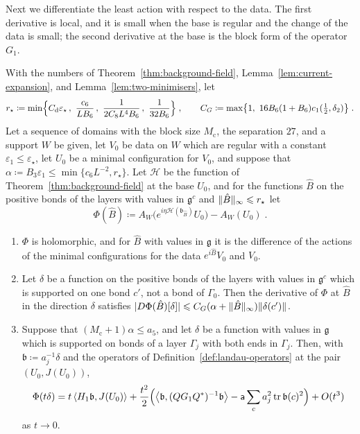 \documentclass[11pt]{preprint}
\DeclarePairedDelimiter{\abs}{\lvert}{\rvert}
\DeclarePairedDelimiter{\norm}{\lVert}{\rVert}
\numberwithin{equation}{section}
\begin{document}
Next we differentiate the least action with respect to the data. The first derivative is local, and it is small when the base is regular and the change of the data is small; the second derivative at the base is the block form of the operator $G_1$.

\begin{lemma}\label{lem:data-action}
With the numbers of Theorem~\ref{thm:background-field}, Lemma~\ref{lem:current-expansion}, and Lemma~\ref{lem:two-minimisers}, let
\begin{equation}\label{eq:data-action-numbers}
    r_\star \coloneqq \min\Bigl\{ C_{\mathrm d}\varepsilon_\star\,,\ \frac{c_6}{LB_6}\,,\ \frac{1}{2C_8L^4B_6}\,,\ \frac{1}{32B_6} \Bigr\}\;,
    \qquad
    C_G \coloneqq \max\bigl\{ 1,\ 16B_6(1 + B_6)c_1(\tfrac{1}{2}, \delta_2) \bigr\}\;.
\end{equation}
Let a sequence of domains with the block size $M_{\mathrm c}$, the separation $27$, and a support $W$ be given, let $V_0$ be data on $W$ which are regular with a constant $\varepsilon_1 \leqslant \varepsilon_\star$, let $U_0$ be a minimal configuration for $V_0$, and suppose that $\alpha \coloneqq B_3\varepsilon_1 \leqslant \min\{ c_6L^{-2}, r_\star \}$. Let $\mathcal H$ be the function of Theorem~\ref{thm:background-field} at the base $U_0$, and for the functions $\hat B$ on the positive bonds of the layers with values in $\mathfrak g^c$ and $\norm{\hat B}_\infty \leqslant r_\star$ let
\begin{equation}\label{eq:data-action}
    \Phi(\hat B) \coloneqq A_W\bigl(e^{i\eta\mathcal H(\mathfrak b_{\hat B})}U_0\bigr) - A_W(U_0)\;.
\end{equation}
\begin{enumerate}[label=(\roman*)]
\item $\Phi$ is holomorphic, and for $\hat B$ with values in $\mathfrak g$ it is the difference of the actions of the minimal configurations for the data $e^{i\hat B}V_0$ and $V_0$.
\item Let $\delta$ be a function on the positive bonds of the layers with values in $\mathfrak g^c$ which is supported on one bond $c'$, not a bond of $\Gamma_0$. Then the derivative of $\Phi$ at $\hat B$ in the direction $\delta$ satisfies $\abs{D\Phi(\hat B)[\delta]} \leqslant C_G(\alpha + \norm{\hat B}_\infty)\norm{\delta(c')}$.
\item Suppose that $(M_{\mathrm c} + 1)\alpha \leqslant a_5$, and let $\delta$ be a function with values in $\mathfrak g$ which is supported on bonds of a layer $\Gamma_j$ with both ends in $\Gamma_j$. Then, with $\mathfrak b \coloneqq a_j^{-1}\delta$ and the operators of Definition~\ref{def:landau-operators} at the pair $(U_0, J(U_0))$,
\begin{equation}\label{eq:data-expansion}
    \Phi(t\delta) = t\,\langle H_1\mathfrak b, J(U_0)\rangle + \frac{t^2}{2}\Bigl(\bigl\langle\mathfrak b, (QG_1Q^*)^{-1}\mathfrak b\bigr\rangle - \mathsf a\sum_ca_j^2\operatorname{tr}\mathfrak b(c)^2\Bigr) + O(t^3)
\end{equation}
as $t \to 0$.
\end{enumerate}
\end{lemma}
\end{document}
